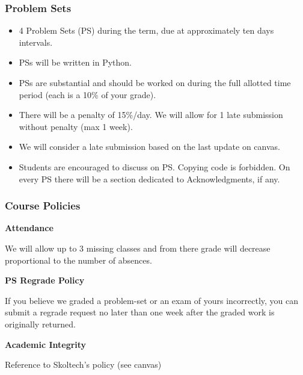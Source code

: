 \documentclass[xetex,mathserif,serif]{beamer} %
\begin{document}
\begin{frame}
\frametitle{Problem Sets}

\begin{itemize}
\item 4 Problem Sets (PS) during the term, due at approximately ten days intervals. 
\item PSs will be written in Python.
\item PSs are substantial and should be worked on during the full allotted time period (each is a 10\% of your grade).
\item There will be a penalty of 15\%/day. We will allow for 1 late submission without penalty (max 1 week).
\item We will consider a late submission based on the last update on canvas.
\item Students are encouraged to discuss on PS. Copying code is forbidden. On every PS there will be a section dedicated to Acknowledgments, if any.
\end{itemize}

\end{frame}


\begin{frame}
\frametitle{Course Policies}

{\bf Attendance}

We will allow up to 3 missing classes and from there grade will decrease proportional to the number of absences.


\vspace{5mm}
{\bf PS Regrade Policy}

If you believe we graded a problem-set or an exam of yours incorrectly, you can submit a regrade request no later than one week after the graded work is originally returned.

\vspace{5mm}
{\bf Academic Integrity}

Reference to Skoltech's policy (see canvas)


\end{frame}
\end{document}
